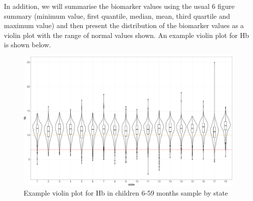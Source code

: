\documentclass[12pt,a4paper]{article}
\begin{document}
In addition, we will summarise the biomarker values using the usual 6 figure summary (minimum value, first quantile, median, mean, third quartile and maximum value) and then present the distribution of the biomarker values as a violin plot with the range of normal values shown. An example violin plot for Hb is shown below.

\begin{figure}[H]

{\centering \includegraphics{sudanMNindicators_files/figure-latex/violin-1} 

}

\caption{Example violin plot for Hb in children 6-59 months sample by state}\label{fig:violin}
\end{figure}

\newpage

\renewcommand\refname{References}

\end{document}
